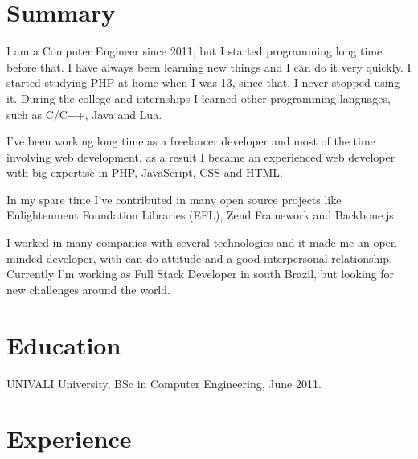 \documentclass[margin]{res}
\begin{document}
  

\address{Florianopolis, BR \\ guilherme@giox.com.br \\ Phone: +55 (48) 9640-3883 }
                           
                        
\begin{resume}                        
 
\section{Summary}   
I am a Computer Engineer since 2011, but I started programming long time before that. I have always been learning new things and I can do it very quickly. I started studying PHP at home when I was 13, since that, I never stopped using it. During the college and internships I learned other programming languages, such as C/C++, Java and Lua.

I’ve been working long time as a freelancer developer and most of the time involving web development, as a result I became an experienced web developer with big expertise in PHP, JavaScript, CSS and HTML.

In my spare time I’ve contributed in many open source projects like Enlightenment Foundation Libraries (EFL), Zend Framework and Backbone.js.

I worked in many companies with several technologies and it made me an open minded developer, with can-do attitude and a good interpersonal relationship. Currently I’m working as Full Stack Developer in south Brazil, but looking for new challenges around the world.
 
\section{Education} UNIVALI University, BSc in Computer Engineering, June 2011.
  
\section{Experience}


\end{resume}
\end{document}
